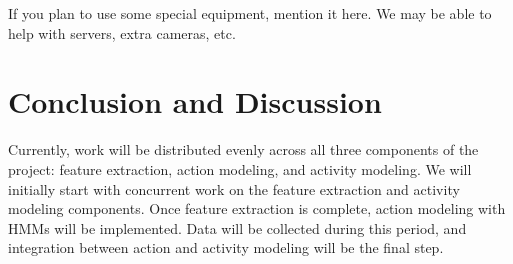 \documentclass[10pt,letterpaper]{article}
\begin{document}
If you plan to use some special equipment, mention it here.   We may be able to help with servers, extra cameras, etc.

 
\section{Conclusion and Discussion}

Currently, work will be distributed evenly across all three components of the project: feature extraction, action modeling, and activity modeling. We will initially start with concurrent work on the feature extraction and activity modeling components. Once feature extraction is complete, action modeling with HMMs will be implemented. Data will be collected during this period, and integration between action and activity modeling will be the final step.

\clearpage

{\small


}
\end{document}
